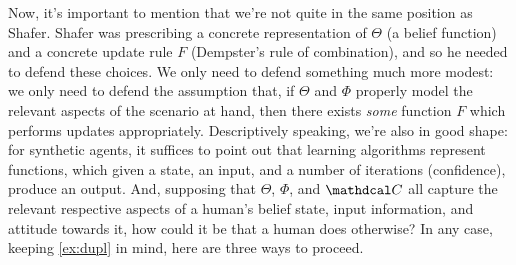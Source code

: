 Now, it's important to mention that we're not quite in the same position as Shafer.
Shafer was prescribing a concrete representation of $\Theta$ (a belief function) and a concrete update rule $F$ (Dempster's rule of combination), and so he needed to defend these choices.
We only need to defend something much more modest: we only need to defend the assumption that, if $\Theta$ and $\Phi$ properly model the relevant aspects of the scenario at hand, then there exists \emph{some} function $F$ which performs updates appropriately.
Descriptively speaking, we're also in good shape: for synthetic agents, it suffices to point out that learning algorithms represent functions, which given a state, an input, and a number of iterations (confidence), produce an output.
And, supposing that $\Theta$, $\Phi$, and $\confdom$ all capture the relevant respective aspects of a human's belief state, input information, and attitude towards it, how could it be that a human does otherwise?
%
In any case, keeping \cref{ex:dupl} in mind, here are three ways to proceed.

